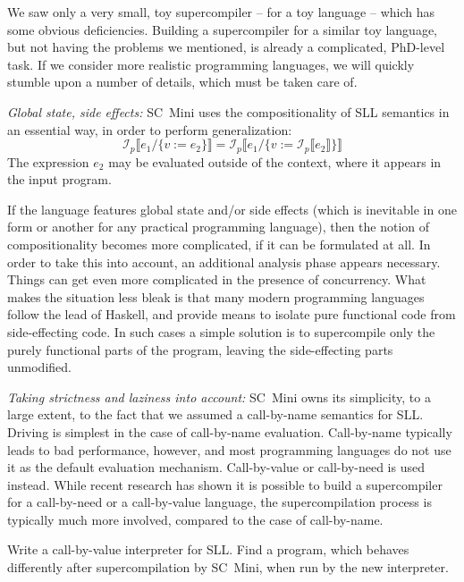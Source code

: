 We saw only a very small, toy supercompiler -- for a toy language -- which
has some obvious deficiencies.
Building a supercompiler for a similar toy language, but not having the
problems we mentioned, is already a complicated, PhD-level task.
If we consider more realistic programming languages,
we will quickly stumble upon a number of details, which must be taken care of.


\emph{Global state, side effects:} SC~Mini uses the compositionality of SLL semantics
in an essential way, in order to perform generalization:
\[\mathcal{I}_p\llbracket e_1 / \{v := e_2\}\rrbracket = \mathcal{I}_p \llbracket e_1 / \{v := \mathcal{I}_p\llbracket e_2\rrbracket\} \rrbracket\]
The expression $e_2$ may be evaluated outside of the context, where it appears in
the input program.

If the language features global state and/or side effects (which is inevitable
in one form or another for any practical programming language),
then the notion of compositionality becomes more complicated, if it can be formulated at all.
In order to take this into account, an additional analysis phase appears necessary.
Things can get even more complicated in the presence of concurrency.
What makes the situation less bleak is that many modern programming languages
follow the lead of Haskell, and provide means to isolate pure functional code
from side-effecting code. In such cases a simple solution is to supercompile only the 
purely functional parts of the program, leaving the side-effecting parts unmodified.

\emph{Taking strictness and laziness into account:} SC~Mini owns its simplicity,
to a large extent, to the fact that we assumed a call-by-name semantics for SLL.
Driving is simplest in the case of call-by-name evaluation.
Call-by-name typically leads to bad performance, however, and
most programming languages do not use it as the default evaluation mechanism.
Call-by-value or call-by-need is used instead.
While recent research has shown it is possible to build a 
supercompiler for a call-by-need \cite{Mitchell2008taa,Mitchell2010Rethinking,Bolingbroke2010Eval} 
or a call-by-value \cite{Jonsson2008Supercompilation,Jonsson2011Phd} language,
the supercompilation process is typically much more involved,
compared to the case of call-by-name.

\begin{exercise}
Write a call-by-value interpreter for SLL. Find a program, which behaves differently
after supercompilation by SC~Mini, when run by the new interpreter.
\end{exercise}

